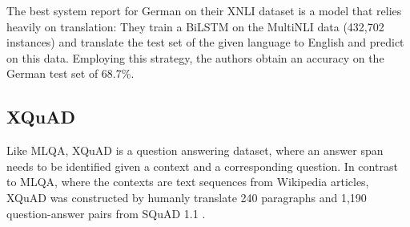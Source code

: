 











The best system \cite{conneau2018xnli} report for German on their XNLI dataset is a model that
relies heavily on translation: They train a BiLSTM on the MultiNLI data (432,702 instances) and
translate the test set of the given language to English and predict on this data. Employing this
strategy, the authors obtain an accuracy on the German test set of 68.7\%.



\subsection{XQuAD}

Like MLQA, XQuAD \citep{artetxe2019cross} is a question answering dataset, where an answer span
needs to be identified given a context and a corresponding question. In contrast to MLQA, where the
contexts are text sequences from Wikipedia articles, XQuAD was constructed by humanly translate 240
paragraphs and 1,190 question-answer pairs from SQuAD 1.1 \citep{rajpurkar2016squad}.

